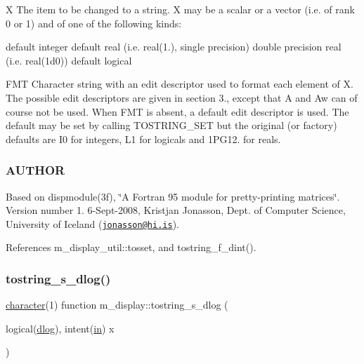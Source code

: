 X The item to be changed to a string. X may be a scalar or a vector (i.\+e. of rank 0 or 1) and of one of the following kinds\+:

default integer default real (i.\+e. real(1.), single precision) double precision real (i.\+e. real(1d0)) default logical

F\+MT Character string with an edit descriptor used to format each element of X. The possible edit descriptors are given in section 3., except that A and Aw can of course not be used. When F\+MT is absent, a default edit descriptor is used. The default may be set by calling T\+O\+S\+T\+R\+I\+N\+G\+\_\+\+S\+ET but the original (or factory) defaults are I0 for integers, L1 for logicals and 1\+P\+G12. for reals.

\subsubsection*{A\+U\+T\+H\+OR}

Based on dispmodule(3f), \char`\"{}\+A Fortran 95 module for pretty-\/printing matrices\char`\"{}. Version number 1. 6-\/\+Sept-\/2008, Kristjan Jonasson, Dept. of Computer Science, University of Iceland (\href{mailto:jonasson@hi.is}{\tt jonasson@hi.\+is}). 

References m\+\_\+display\+\_\+util\+::tosset, and tostring\+\_\+f\+\_\+dint().

\mbox{\label{namespacem__display_a75e826c601efdb91148684ebaf34788b}} 
\subsubsection{\texorpdfstring{tostring\+\_\+s\+\_\+dlog()}{tostring\_s\_dlog()}}
{\footnotesize\ttfamily \hyperlink{option__stopwatch_83_8txt_abd4b21fbbd175834027b5224bfe97e66}{character}(1) function m\+\_\+display\+::tostring\+\_\+s\+\_\+dlog (\begin{DoxyParamCaption}\item[{logical(\hyperlink{namespacem__display_a8c6a3df510feabf6bc84dd0a8789f98c}{dlog}), intent(\hyperlink{M__journal_83_8txt_afce72651d1eed785a2132bee863b2f38}{in})}]{x }\end{DoxyParamCaption})\hspace{0.3cm}{\ttfamily [private]}}



